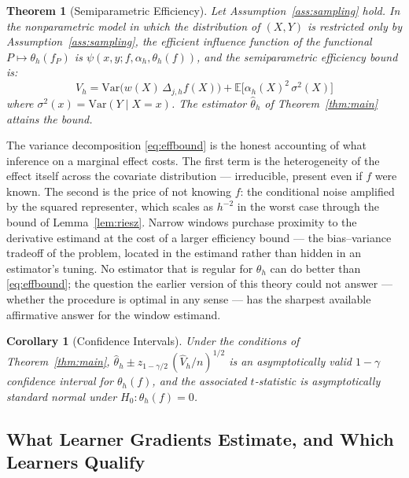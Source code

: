 \documentclass[12pt,a4paper]{article}
\numberwithin{equation}{section}
\theoremstyle{plain}
\newtheorem{theorem}{Theorem}
\newtheorem{corollary}{Corollary}
\theoremstyle{definition}
\newcommand{\E}{\mathbb{E}}
\newcommand{\Dh}{\Delta_{j,h}}
\begin{document}
	\begin{theorem}[Semiparametric Efficiency]
		\label{thm:efficiency}
		Let Assumption~\ref{ass:sampling} hold. In the nonparametric model in which the
		distribution of $(X, Y)$ is restricted only by
		Assumption~\ref{ass:sampling}, the efficient influence function of the
		functional $P \mapsto \theta_h(f_P)$ is
		$\psi(x, y; f, \alpha_h, \theta_h(f))$, and the semiparametric efficiency
		bound is:
		\begin{equation}
			V_h = \mathrm{Var}\bigl(w(X)\, \Dh f(X)\bigr)
			+ \E\bigl[\alpha_h(X)^2\, \sigma^2(X)\bigr]
			\label{eq:effbound}
		\end{equation}
		where $\sigma^2(x) = \mathrm{Var}(Y \mid X = x)$. The estimator
		$\hat{\theta}_h$ of Theorem~\ref{thm:main} attains the bound.
	\end{theorem}
	
	The variance decomposition \eqref{eq:effbound} is the honest accounting of what
	inference on a marginal effect costs. The first term is the heterogeneity of the
	effect itself across the covariate distribution --- irreducible, present even if
	$f$ were known. The second is the price of not knowing $f$: the conditional noise
	amplified by the squared representer, which scales as $h^{-2}$ in the worst case
	through the bound of Lemma~\ref{lem:riesz}. Narrow windows purchase proximity to
	the derivative estimand at the cost of a larger efficiency bound --- the
	bias--variance tradeoff of the problem, located in the estimand rather than hidden
	in an estimator's tuning. No estimator that is regular for $\theta_h$ can do better
	than \eqref{eq:effbound}; the question the earlier version of this theory could not
	answer --- whether the procedure is optimal in any sense --- has the sharpest
	available affirmative answer for the window estimand.
	
	\begin{corollary}[Confidence Intervals]
		\label{cor:ci}
		Under the conditions of Theorem~\ref{thm:main},
		$\hat{\theta}_h \pm z_{1-\gamma/2}\, (\hat{V}_h / n)^{1/2}$ is an
		asymptotically valid $1 - \gamma$ confidence interval for $\theta_h(f)$, and
		the associated $t$-statistic is asymptotically standard normal under
		$H_0 : \theta_h(f) = 0$.
	\end{corollary}
	
	
	\subsection{What Learner Gradients Estimate, and Which Learners Qualify}
	\label{sec:gradients}
\end{document}
